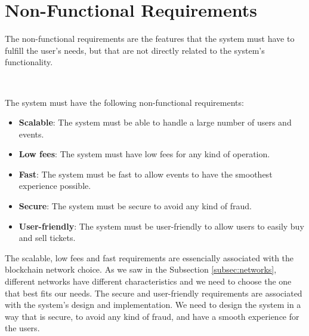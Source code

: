 \section{Non-Functional Requirements}
\label{sec:non_functional_requirements}

The non-functional requirements are the features that the system must have to fulfill the user's needs, but that are not directly related to the system's functionality.

~

The system must have the following non-functional requirements:
\begin{itemize}
    \item \textbf{Scalable}: The system must be able to handle a large number of users and events.
    \item \textbf{Low fees}: The system must have low fees for any kind of operation.
    \item \textbf{Fast}: The system must be fast to allow events to have the smoothest experience possible.
    \item \textbf{Secure}: The system must be secure to avoid any kind of fraud.
    \item \textbf{User-friendly}: The system must be user-friendly to allow users to easily buy and sell tickets.
\end{itemize}

The scalable, low fees and fast requirements are essencially associated with the blockchain network choice. As we saw in the Subsection \ref{subsec:networks}, different networks have different characteristics and we need to choose the one that best fits our needs.
The secure and user-friendly requirements are associated with the system's design and implementation. We need to design the system in a way that is secure, to avoid any kind of fraud, and have a smooth experience for the users.